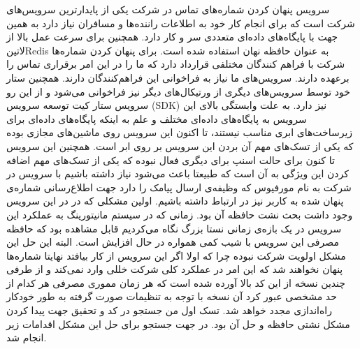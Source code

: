 \documentclass[a4]{report}
\begin{document}
سرویس پنهان کردن شماره‌های تماس در شرکت یکی از پایدارترین سرویس‌های شرکت است
که برای انجام کار خود به اطلاعات راننده‌ها و مسافران نیاز دارد
به همین جهت با پایگاه‌های داده‌ای متعددی سر و کار دارد.
همچنین برای سرعت عمل بالا از ‌لاتین{Redis} به عنوان حافظه نهان استفاده شده است.
برای پنهان کردن شماره‌ها شرکت با فراهم کنندگان مختلفی قرارداد دارد که ما را در این امر برقراری تماس را برعهده دارند.
سرویس‌های ما نیاز به فراخوانی این فراهم‌کنندگان دارند.
همچنین ستار خود توسط سرویس‌های دیگری از ورتیکال‌های دیگر نیز فراخوانی می‌شود و از این رو سرویس ستار
کیت توسعه سرویس (SDK) نیز دارد.
به علت وابستگی بالای این سرویس به پایگاه‌های داده‌ای مختلف و علم به اینکه پایگاه‌های داده‌ای
برای زیرساخت‌های ابری مناسب نیستند، تا اکنون این سرویس روی ماشین‌های مجازی بوده که یکی از تسک‌های مهم آن بردن این سرویس بر روی ابر است.
همچنین این سرویس تا کنون برای حالت اسنپ برای دیگری فعال نبوده که یکی از تسک‌های مهم اضافه کردن این ویژگی به آن است که طبیعتا باعث
می‌شود نیاز داشته باشیم با سرویس در شرکت به نام مورفیوس که وظیفه‌ی ارسال پیامک را دارد جهت اطلاع‌رسانی شماره‌ی پنهان شده به کاربر نیز در ارتباط داشته باشیم.
اولین مشکلی که در در این سرویس وجود داشت بحث نشت حافظه آن بود.
زمانی که در سیستم مانیتورینگ به عملکرد این سرویس در یک بازه‌ی زمانی نستا بزرگ نگاه می‌کردیم قابل مشاهده بود که حافظه مصرفی این سرویس با شیب کمی همواره در حال
افزایش است.
البته این حل این مشکل اولویت شرکت نبوده چرا که اولا اگر این سرویس از کار بیافتد نهایتا شماره‌ها پنهان نخواهند شد
که این امر در عملکرد کلی شرکت خللی وارد نمی‌کند و از طرفی چندین نسخه از این کد بالا آورده شده است که هر زمان مموری مصرفی هر کدام از حد مشخصی عبور کرد
آن نسخه با توجه به تنظیمات صورت گرفته به طور خودکار راه‌اندازی مجدد خواهد شد.
تسک اول من جستجو در کد و تحقیق جهت پیدا کردن مشکل نشتی حافظه و حل آن بود.
در جهت جستجو برای حل این مشکل اقدامات زیر انجام شد.
\end{document}
